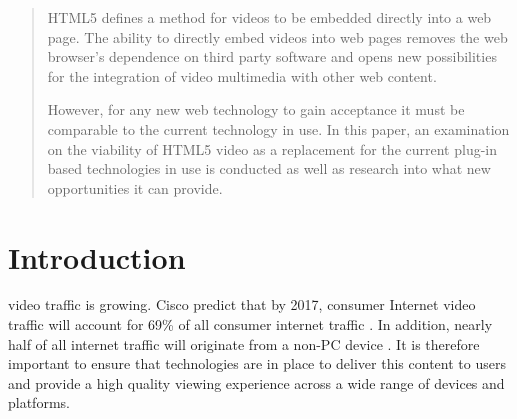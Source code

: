 \documentclass[journal]{IEEEtran}
\begin{document}







\maketitle


\begin{abstract}
HTML5 defines a method for videos to be embedded directly into a web page. The ability to directly embed videos into web pages removes the web browser's dependence on third party software and opens new possibilities for the integration of video multimedia with other web content.

However, for any new web technology to gain acceptance it must be comparable to the current technology in use. In this paper, an examination on the viability of HTML5 video as a replacement for the current plug-in based technologies in use is conducted as well as research into what new opportunities it can provide.
\end{abstract}

\IEEEpeerreviewmaketitle

\section{Introduction}
 video traffic is growing. Cisco predict that by 2017, consumer Internet video traffic will account for 69\% of all consumer internet traffic \cite{website:ciscoForecastAndMethodology}. In addition, nearly half of all internet traffic will originate from a non-PC device \cite{website:ciscoForecastAndMethodology}. It is therefore important to ensure that technologies are in place to deliver this content to users and provide a high quality viewing experience across a wide range of devices and platforms.
\end{document}
